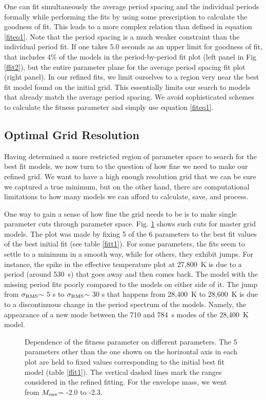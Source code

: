 \documentclass[12pt,preprint]{aastex}
\newcommand{\sigrms}{$\sigma_{\rm RMS}$}
\newcommand{\menv}{$M_{\rm env}$}
\begin{document}
One can fit simultaneously the average period spacing and the individual periods 
formally while performing the fits by using some prescription to calculate the goodness of fit. 
This leads to a more complex relation than defined in equation \ref{fiteq1}. 
Note that the period spacing is a much weaker constraint than the individual period fit. 
If one takes 5.0 seconds as an upper limit for goodness of fit, that includes 4\% of the models in the 
period-by-period fit plot (left panel in Fig \ref{ffit2}), but the entire parameter plane 
for the average period spacing fit plot (right panel). In our refined fits, we limit ourselves to a 
region very near the best fit model found on the initial grid. This essentially limits our search 
to models that already match the average period spacing. We avoid sophisticated schemes to calculate 
the fitness parameter and simply use equation \ref{fiteq1}.


\subsection{Optimal Grid Resolution}
\label{refinedfits}


Having determined a more restricted region of parameter space to search for 
the best fit models, we now turn to the question of how fine we need to 
make our refined grid. We want to have a high enough resolution grid that 
we can be sure we captured a true minimum, but on the other hand, there are 
computational limitations to how many models we can afford to calculate, 
save, and process.

One way to gain a sense of how fine the grid needs to be is to make single 
parameter cuts through parameter space. Fig.  \ref{ffit3} shows such cuts 
for master grid models. The plot was made by fixing 5 of the 6 parameters 
to the best fit values of the best initial fit (see table \ref{fitt1}).
For some parameters, the fits seem to settle to a minimum in a 
smooth way, while for others, they exhibit jumps. For instance, the spike 
in the effective temperature plot at 27,800~K is due to a period (around 530~s) 
that goes away and then comes back. The model with the missing period fits poorly 
compared to the models on either side of it. The jump from \sigrms $\sim$ 5 s 
to \sigrms $\sim$ 30 s that happens from 28,400~K to 28,600~K is due to a discontinuous 
change in the period spectrum of the models. Namely, the appearance of a new mode 
between the 710 and 784~s modes of the 28,400~K model. 

\begin{figure}
\caption{
Dependence of the fitness parameter on different parameters. The 5 parameters other than the one shown 
on the horizontal axis in each plot are held to fixed values corresponding to the initial best fit
model (table \ref{ffit1}). The vertical dashed lines mark the ranges considered in the refined 
fitting. For the envelope mass, we went from \menv = -2.0 to -2.3.
 \label{ffit3}
}
\end{figure}
\end{document}
